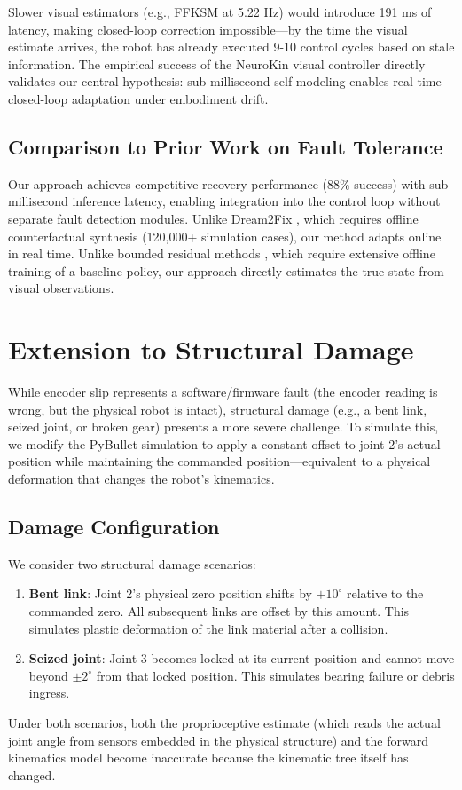 \documentclass[12pt,a4paper,oneside]{report}
\begin{document}
Slower visual estimators (e.g., FFKSM at 5.22 Hz) would introduce 191 ms of latency, making closed-loop correction impossible---by the time the visual estimate arrives, the robot has already executed 9-10 control cycles based on stale information. The empirical success of the NeuroKin visual controller directly validates our central hypothesis: sub-millisecond self-modeling enables real-time closed-loop adaptation under embodiment drift.

\subsection{Comparison to Prior Work on Fault Tolerance}

Our approach achieves competitive recovery performance (88\% success) with sub-millisecond inference latency, enabling integration into the control loop without separate fault detection modules. Unlike Dream2Fix \cite{li2025dream2fix}, which requires offline counterfactual synthesis (120,000+ simulation cases), our method adapts online in real time. Unlike bounded residual methods \cite{jayasinghe2026residual}, which require extensive offline training of a baseline policy, our approach directly estimates the true state from visual observations.

\section{Extension to Structural Damage}

While encoder slip represents a software/firmware fault (the encoder reading is wrong, but the physical robot is intact), structural damage (e.g., a bent link, seized joint, or broken gear) presents a more severe challenge. To simulate this, we modify the PyBullet simulation to apply a constant offset to joint 2's actual position while maintaining the commanded position---equivalent to a physical deformation that changes the robot's kinematics.

\subsection{Damage Configuration}

We consider two structural damage scenarios:
\begin{enumerate}
    \item \textbf{Bent link}: Joint 2's physical zero position shifts by $+10^\circ$ relative to the commanded zero. All subsequent links are offset by this amount. This simulates plastic deformation of the link material after a collision.
    \item \textbf{Seized joint}: Joint 3 becomes locked at its current position and cannot move beyond $\pm2^\circ$ from that locked position. This simulates bearing failure or debris ingress.
\end{enumerate}
Under both scenarios, both the proprioceptive estimate (which reads the actual joint angle from sensors embedded in the physical structure) and the forward kinematics model become inaccurate because the kinematic tree itself has changed.
\end{document}
